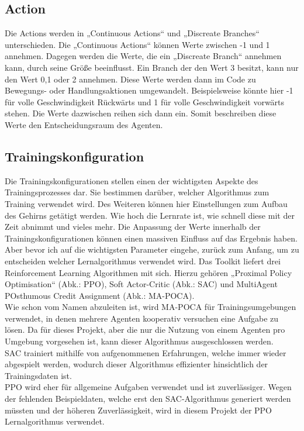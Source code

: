 \subsection{Action}
\label{action}
Die Actions werden in „Continuous Actions“ und „Discreate Branches“ unterschieden. Die „Continuous Actions“ können Werte zwischen -1 und 1 annehmen. Dagegen werden die Werte, die ein „Discreate Branch“ annehmen kann, durch seine Größe beeinflusst. Ein Branch der den Wert 3 besitzt, kann nur den Wert 0,1 oder 2 annehmen. Diese Werte werden dann im Code zu Bewegungs- oder Handlungsaktionen umgewandelt. Beispielsweise könnte hier -1 für volle Geschwindigkeit Rückwärts und 1 für volle Geschwindigkeit vorwärts stehen. Die Werte dazwischen reihen sich dann ein. Somit beschreiben diese Werte den Entscheidungsraum des Agenten. 

\subsection{Trainingskonfiguration}
Die Trainingskonfigurationen stellen einen der wichtigsten Aspekte des Trainingsprozesses dar. Sie bestimmen darüber, welcher Algorithmus zum Training verwendet wird. Des Weiteren können hier Einstellungen zum Aufbau des Gehirns getätigt werden. Wie hoch die Lernrate ist, wie schnell diese mit der Zeit abnimmt und vieles mehr. Die Anpassung der Werte innerhalb der Trainingskonfigurationen können einen massiven Einfluss auf das Ergebnis haben. 
\\
Aber bevor ich auf die wichtigsten Parameter eingehe, zurück zum Anfang, um zu entscheiden welcher Lernalgorithmus verwendet wird. Das Toolkit liefert drei Reinforcement Learning Algorithmen mit sich. Hierzu gehören „Proximal Policy Optimisation“ (Abk.: PPO), Soft Actor-Critic (Abk.: SAC) und MultiAgent POsthumous Credit Assignment (Abk.: MA-POCA). 
\\
Wie schon vom Namen abzuleiten ist, wird MA-POCA für Trainingsumgebungen verwendet, in denen mehrere Agenten kooperativ versuchen eine Aufgabe zu lösen. Da für dieses Projekt, aber die nur die Nutzung von einem Agenten pro Umgebung vorgesehen ist, kann dieser Algorithmus ausgeschlossen werden.\cite{mapoca}
\\
SAC trainiert mithilfe von aufgenommenen Erfahrungen, welche immer wieder abgespielt werden, wodurch dieser Algorithmus effizienter hinsichtlich der Trainingsdaten ist.\cite{sac}
\\
PPO wird eher für allgemeine Aufgaben verwendet und ist zuverlässiger.\cite{mapoca} Wegen der fehlenden Beispieldaten, welche erst den SAC-Algorithmus generiert werden müssten und der höheren Zuverlässigkeit, wird in diesem Projekt der PPO Lernalgorithmus verwendet.
\\

